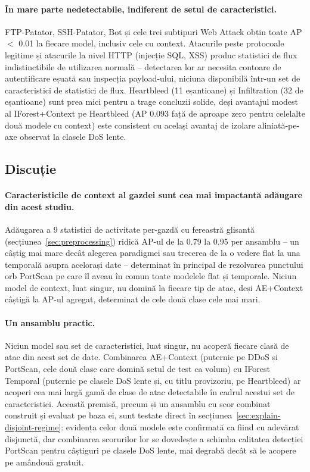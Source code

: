 \paragraph{În mare parte nedetectabile, indiferent de setul de caracteristici.} FTP-Patator, SSH-Patator, Bot și cele trei subtipuri Web Attack obțin toate AP $<$ 0.01 la fiecare model, inclusiv cele cu context.
Atacurile peste protocoale legitime și atacurile la nivel HTTP (injecție SQL, XSS) produc statistici de flux indistinctibile de utilizarea normală -- detectarea lor ar necesita contoare de autentificare eșuată sau inspecția payload-ului, niciuna disponibilă într-un set de caracteristici de statistici de flux. Heartbleed (11 eșantioane) și Infiltration (32 de eșantioane) sunt prea mici pentru a trage concluzii solide, deși avantajul modest al IForest+Context pe Heartbleed (AP 0.093 față de aproape zero pentru celelalte două modele cu context) este consistent cu același avantaj de izolare aliniată-pe-axe observat la clasele DoS lente.

\subsection{Discuție}

\paragraph{Caracteristicile de context al gazdei sunt cea mai impactantă adăugare din acest studiu.} Adăugarea a 9 statistici de activitate per-gazdă cu fereastră glisantă (secțiunea~\ref{sec:preprocessing}) ridică AP-ul de la 0.79 la 0.95 per ansamblu -- un câștig mai mare decât alegerea paradigmei sau trecerea de la o vedere flat la una temporală asupra acelorași date -- determinat în principal de rezolvarea punctului orb PortScan pe care îl aveau în comun toate modelele flat și temporale. Niciun model de context, luat singur, nu domină la fiecare tip de atac, deși AE+Context câștigă la AP-ul agregat, determinat de cele două clase cele mai mari.

\paragraph{Un ansamblu practic.} Niciun model sau set de caracteristici, luat singur, nu acoperă fiecare clasă de atac din acest set de date. Combinarea AE+Context (puternic pe DDoS și PortScan, cele două clase care domină setul de test ca volum) cu IForest Temporal (puternic pe clasele DoS lente și, cu titlu provizoriu, pe Heartbleed) ar acoperi cea mai largă gamă de clase de atac detectabile în cadrul acestui set de caracteristici. Această premisă, precum și un ansamblu cu scor combinat construit și evaluat pe baza ei, sunt testate direct în secțiunea~\ref{sec:explain-disjoint-regime}: evidența celor două modele este confirmată ca fiind cu adevărat disjunctă, dar combinarea scorurilor lor se dovedește a schimba calitatea detecției PortScan pentru câștiguri pe clasele DoS lente, mai degrabă decât să le acopere pe amândouă gratuit.